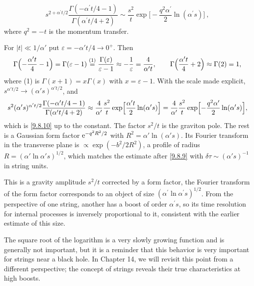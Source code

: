 \begin{equation}
	s^{2+\alpha^{\prime}t/2} \frac{\Gamma(-\alpha^{\prime} t/4 - 1)}{\Gamma(\alpha^{\prime} t/4 + 2)} \sim 
	\frac{s^{2}}{t} \exp \biggl[-\frac{q^{2} \alpha^{\prime}}{2} \ln (\alpha^{\prime} s)\biggr] \:, \label{9.8.10}
\end{equation}
where $q^{2}=-t$ is the momentum transfer.
\begin{tcolorbox}[breakable]
	\begin{remark}
		For $|t|\ll1/\alpha'$ put $\varepsilon=-\alpha't/4\to0^+$. Then
		\begin{equation*}
			\Gamma\Bigl(-\frac{\alpha't}{4}-1\Bigr)=\Gamma(\varepsilon-1)\overset{(1)}{=}\frac{\Gamma(\varepsilon)}{\varepsilon-1}\approx-\frac1\varepsilon=\frac{4}{\alpha't},\qquad\Gamma\Bigl(\frac{\alpha't}{4}+2\Bigr)\approx\Gamma(2)=1,
		\end{equation*}
		where (1) is $\Gamma(x+1)=x\Gamma(x)$ with $x=\varepsilon-1$. With the scale made explicit, $s^{\alpha't/2}\to(\alpha's)^{\alpha't/2}$, and
		\begin{equation*}
			s^{2}(\alpha's)^{\alpha't/2}\frac{\Gamma(-\alpha't/4-1)}{\Gamma(\alpha't/4+2)}\approx\frac{4}{\alpha'}\frac{s^2}{t}\exp\Bigl[\frac{\alpha't}{2}\ln(\alpha's)\Bigr]=\frac{4}{\alpha'}\frac{s^2}{t}\exp\Bigl[-\frac{q^2\alpha'}{2}\ln(\alpha's)\Bigr],
		\end{equation*}
		which is \eqref{9.8.10} up to the constant. The factor $s^2/t$ is the graviton pole. The rest is a Gaussian form factor $\mathrm{e}^{-q^2R^2/2}$ with $R^2=\alpha'\ln(\alpha's)$. Its Fourier transform in the transverse plane is $\propto\exp(-b^2/2R^2)$, a profile of radius $R=(\alpha'\ln\alpha's)^{1/2}$, which matches the estimate after \eqref{9.8.9} with $\delta\tau\sim(\alpha's)^{-1}$ in string units.
	\end{remark}
\end{tcolorbox}
This is a gravity amplitude $s^{2} / t$ corrected by a form factor, 
the Fourier transform of the form factor corresponds to an object of size $(\alpha^{\prime} \ln \alpha^{\prime} s)^{1/2}$. 
From the perspective of one string, another has a boost of order $\alpha^{\prime} s$, so its time resolution for internal processes is inversely proportional to it, consistent with the earlier estimate of this size.

The square root of the logarithm is a very slowly growing function and is generally not important, but it is a reminder that this behavior is very important for strings near a black hole. 
In Chapter 14, we will revisit this point from a different perspective; the concept of strings reveals their true characteristics at high boosts.

